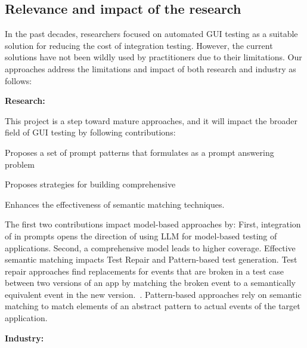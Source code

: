 \subsection{Relevance and impact of the research }


In the past decades, researchers focused on automated GUI testing as a suitable solution for reducing the cost of integration testing. However, the current solutions have not been wildly used by practitioners due to their limitations. 
Our approaches address the limitations and impact of both research and industry as follows:




\smallskip
\noindent
\textbf{Research:}

\noindent
This project is a step toward mature \testreuse approaches, and it will impact the broader field of GUI testing by following contributions: 
\begin{inparaenum}[(i)]
\item Proposes a set of prompt patterns that formulates \testreuse as a prompt answering problem 
\item Proposes strategies for building comprehensive  \tam
\item Enhances the effectiveness of semantic matching techniques.
\end{inparaenum}
The first two contributions impact model-based approaches by:
First, integration of \tam in prompts opens the direction of using LLM for model-based testing of applications.
Second, a comprehensive model leads to higher coverage.
Effective semantic matching impacts Test Repair and Pattern-based test generation.
Test repair approaches find replacements for events that are broken in a test case between two versions of an app by matching the broken event to a semantically equivalent event in the new version.~\cite{Choudhary:Water:ETSE:2011,Stocco:VisualRepair:FSE:2018,Pan:Meter:TSE:2022}.
Pattern-based approaches rely on semantic matching to match elements of an abstract pattern to actual events of the target application.


\smallskip
\noindent
\textbf{Industry:}

